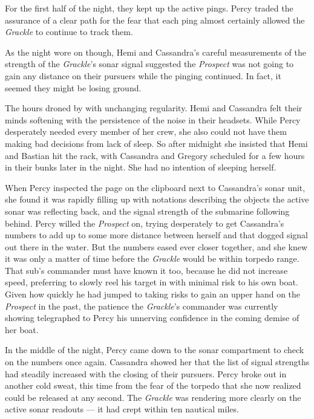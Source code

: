 \documentclass[
]{scrbook}
\begin{document}
For the first half of the night, they kept up the active pings. Percy
traded the assurance of a clear path for the fear that each ping almost
certainly allowed the \emph{Grackle} to continue to track them.

As the night wore on though, Hemi and Cassandra's careful measurements
of the strength of the \emph{Grackle}'s sonar signal suggested the
\emph{Prospect} was not going to gain any distance on their pursuers
while the pinging continued. In fact, it seemed they might be losing
ground.

The hours droned by with unchanging regularity. Hemi and Cassandra felt
their minds softening with the persistence of the noise in their
headsets. While Percy desperately needed every member of her crew, she
also could not have them making bad decisions from lack of sleep. So
after midnight she insisted that Hemi and Bastian hit the rack, with
Cassandra and Gregory scheduled for a few hours in their bunks later in
the night. She had no intention of sleeping herself.

When Percy inspected the page on the clipboard next to Cassandra's sonar
unit, she found it was rapidly filling up with notations describing the
objects the active sonar was reflecting back, and the signal strength of
the submarine following behind. Percy willed the \emph{Prospect} on,
trying desperately to get Cassandra's numbers to add up to some more
distance between herself and that dogged signal out there in the water.
But the numbers eased ever closer together, and she knew it was only a
matter of time before the \emph{Grackle} would be within torpedo range.
That sub's commander must have known it too, because he did not increase
speed, preferring to slowly reel his target in with minimal risk to his
own boat. Given how quickly he had jumped to taking risks to gain an
upper hand on the \emph{Prospect} in the past, the patience the
\emph{Grackle}'s commander was currently showing telegraphed to Percy
his unnerving confidence in the coming demise of her boat.

In the middle of the night, Percy came down to the sonar compartment to
check on the numbers once again. Cassandra showed her that the list of
signal strengths had steadily increased with the closing of their
pursuers. Percy broke out in another cold sweat, this time from the fear
of the torpedo that she now realized could be released at any second.
The \emph{Grackle} was rendering more clearly on the active sonar
readouts --- it had crept within ten nautical miles.
\end{document}

